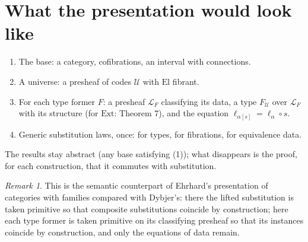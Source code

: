 \documentclass[11pt]{article}
\newcommand{\El}{\mathrm{El}}
\newcommand{\Ext}{\mathrm{Ext}}
\newcommand{\U}{\mathcal{U}}
\newcommand{\LD}{\mathcal{L}}
\theoremstyle{remark}
\newtheorem*{remark}{Remark}
\begin{document}
\section{What the presentation would look like}

\begin{enumerate}
\item The base: a category, cofibrations, an interval with connections.
\item A universe: a presheaf of codes $\U$ with $\El$ fibrant.
\item For each type former $F$: a presheaf $\LD_F$ classifying its data, a
  type $F_{\U}$ over $\LD_F$ with its structure (for $\Ext$: Theorem 7),
  and the equation $\ell_{\alpha[s]} = \ell_\alpha\circ s$.
\item Generic substitution laws, once: for types, for fibrations, for
  equivalence data.
\end{enumerate}
The results stay abstract (any base satisfying (1)); what disappears is the
proof, for each construction, that it commutes with substitution.

\begin{remark}
This is the semantic counterpart of Ehrhard's presentation of categories
with families compared with Dybjer's: there the lifted substitution is
taken primitive so that composite substitutions coincide by construction;
here each type former is taken primitive on its classifying presheaf so
that its instances coincide by construction, and only the equations of
data remain.
\end{remark}
\end{document}
